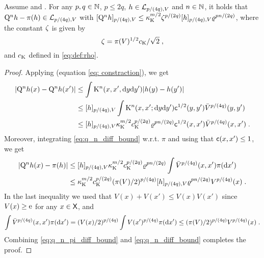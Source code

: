 \begin{lemma}
\label{lem: P^n h class}
Assume  and . For any $p,q \in \nset$, $p \leq 2q$, $h \in \Lclass_{p/(4q),V}$ and $n \in \nset$, it holds that $\MK^n h - \pi(h) \in \Lclass_{p/(4q),V}$ with $\Nnorm[p/(4q), V]{\MK^n h} \leq \boundmetric^{m/2} \constlemqnpi^{p/(2q)}  \Nnorm[p/(4q),V]{h} \ratewas^{pn/(2q)}$, where the constant $\constlemqnpi$ is given by
\begin{equation}
\label{eq:kappa_alpha_def}
\constlemqnpi = \pi(V)^{1/2} \vartconstwas/\sqrt{2}\eqsp,
\end{equation}
and $\vartconstwas$ defined in \eqref{eq:def:rho}.
\end{lemma}
\begin{proof}
Applying  (equation \eqref{eq: constraction}), we get
\begin{align}
    |\MK^n h(x) - \MK^n h(x')| &\le \int \MKK^n(x,x', \rmd y \rmd y') |h(y) - h(y')| \nonumber\\
    & \leq \Nnorm[p/(4q), V]{h} \int \MKK^n(x,x'; \rmd y \rmd y') \metricc^{1/2}(y,y') \bar V^{p / (4q)}(y,y') \nonumber \\
    & \leq \Nnorm[p/(4q), V]{h} \boundmetric^{m/2} \vartconstwas^{p/(2q)} \ratewas^{pn/(2q)} \metricc^{1/2}(x,x') \bar{V}^{p/(4q)}(x,x')\eqsp. \label{eq:q_n_diff_bound}
\end{align}
Moreover, integrating \eqref{eq:q_n_diff_bound} w.r.t. $\pi$ and using that $\metricc(x,x') \leq 1$, we get
\begin{align}
| \MK^n h(x)  - \pi(h)|
&\leq \Nnorm[p/(4q), V]{h} \boundmetric^{m/2} \vartconstwas^{p/(2q)} \ratewas^{pn/(2q)} \int \bar{V}^{p/(4q)}(x,x') \pi(\rmd x') \nonumber \\
&\leq \boundmetric^{m/2} \vartconstwas^{p/(2q)} (\pi(V)/2)^{p/(4q)} \Nnorm[p/(4q), V]{h} \ratewas^{pn/(2q)} V^{p /(4q)}(x) \eqsp. \label{eq:q_n_pi_diff_bound}
\end{align}
In the last inequality we used that $V(x) + V(x') \leq V(x)V(x')$ since $V(x) \geq \rme$ for any $x \in \Xset$, and
\begin{align*}
\int \bar{V}^{p/(4q)}(x,x') \pi(\rmd x') = (V(x)/2)^{p/(4q)}\int V(x')^{p/(4q)} \pi(\rmd x') \leq (\pi(V)/2)^{p/(4q)}V^{p/(4q)}(x)\eqsp.
\end{align*}
Combining \eqref{eq:q_n_pi_diff_bound} and \eqref{eq:q_n_diff_bound} completes the proof.
\end{proof}

